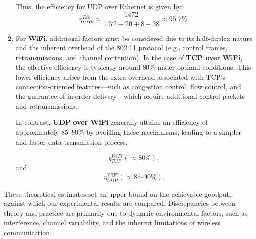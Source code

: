 \begin{enumerate}
                \noindent Thus, the efficiency for UDP over Ethernet is given by:
                \[
                \eta_{UDP}^{Eth} \approx \frac{1472}{1472 + 20 + 8 + 38} \approx 95.7\%.
                \]


            \item  
                For \textbf{WiFi}, additional factors must be considered due to its half-duplex nature and the inherent overhead of the 802.11 protocol (e.g., control frames, retransmissions, and channel contention). 
                In the case of \textbf{TCP over WiFi}, the effective efficiency is typically around 80\% under optimal conditions. 
                This lower efficiency arises from the extra overhead associated with TCP’s connection-oriented features—such as congestion control, 
                flow control, and the guarantee of in-order delivery—which require additional control packets and retransmissions. 
                
                In contrast, \textbf{UDP over WiFi} generally attains an efficiency of approximately 85–90\% by avoiding these mechanisms, 
                leading to a simpler and faster data transmission process.
        
                \[
                    \eta_{TCP}^{WiFi} (\approx 80\%),
                \]
                and
                \[
                    \eta_{UDP}^{WiFi} (\approx 85\text{–}90\%).
                \]
            
        \end{enumerate}

        \noindent These theoretical estimates set an upper bound on the achievable goodput, against which our experimental results are compared. 
        Discrepancies between theory and practice are primarily due to dynamic environmental factors, such as interference, channel variability, and the inherent limitations of wireless communication.
